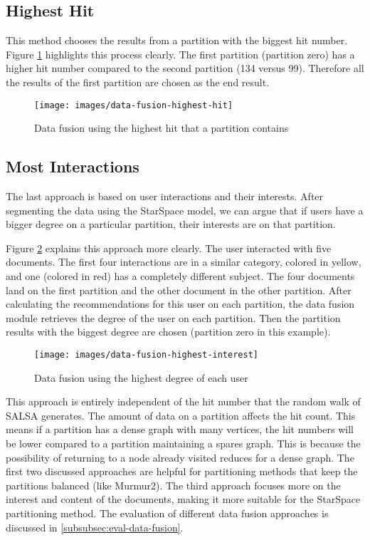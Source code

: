 \subsection{Highest Hit}
\label{subsec:data-fusion-highest-hit}
This method chooses the results from a partition with the biggest hit number. Figure \ref{fig:data-fusion-highest-hit} highlights this process clearly. The first partition (partition zero) has a higher hit number compared to the second partition (134 versus 99). Therefore all the results of the first partition are chosen as the end result.

\begin{figure}[!ht]
    \centering
    \texttt{[image: images/data-fusion-highest-hit]}
    \caption{Data fusion using the highest hit that a partition contains}
    \label{fig:data-fusion-highest-hit}
\end{figure}

\subsection{Most Interactions}
\label{subsec:data-fusion-most-interactions}
The last approach is based on user interactions and their interests. After segmenting the data using the StarSpace model, we can argue that if users have a bigger degree on a particular partition, their interests are on that partition.


Figure \ref{fig:data-fusion-highest-ineterest} explains this approach more clearly. The user interacted with five documents. The first four interactions are in a similar category, colored in yellow, and one (colored in red) has a completely different subject. The four documents land on the first partition and the other document in the other partition. After calculating the recommendations for this user on each partition, the data fusion module retrieves the degree of the user on each partition. Then the partition results with the biggest degree are chosen (partition zero in this example).


\begin{figure}[!ht]
    \centering
    \texttt{[image: images/data-fusion-highest-interest]}
    \caption{Data fusion using the highest degree of each user}
    \label{fig:data-fusion-highest-ineterest}
\end{figure}


This approach is entirely independent of the hit number that the random walk of SALSA generates. The amount of data on a partition affects the hit count. This means if a partition has a dense graph with many vertices, the hit numbers will be lower compared to a partition maintaining a spares graph. This is because the possibility of returning to a node already visited reduces for a dense graph. The first two discussed approaches are helpful for partitioning methods that keep the partitions balanced (like Murmur2). The third approach focuses more on the interest and content of the documents, making it more suitable for the StarSpace partitioning method. The evaluation of different data fusion approaches is discussed in \ref{subsubsec:eval-data-fusion}.


